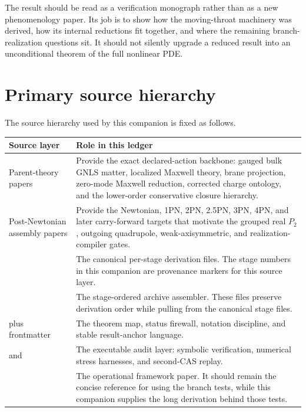 The result should be read as a verification monograph rather than as a new phenomenology paper.  Its job is to show how the moving-throat machinery was derived, how its internal reductions fit together, and where the remaining branch-realization questions sit.  It should not silently upgrade a reduced result into an unconditional theorem of the full nonlinear PDE.

\section{Primary source hierarchy}

The source hierarchy used by this companion is fixed as follows.

\begin{longtable}{L{0.25\textwidth}L{0.68\textwidth}}
\toprule
Source layer & Role in this ledger \\
\midrule
\endhead
Parent-theory papers & Provide the exact declared-action backbone: gauged bulk GNLS matter, localized Maxwell theory, brane projection, zero-mode Maxwell reduction, corrected charge ontology, and the lower-order conservative closure hierarchy. \\
\addlinespace
Post-Newtonian assembly papers & Provide the Newtonian, 1PN, 2PN, 2.5PN, 3PN, 4PN, and later carry-forward targets that motivate the grouped real \(P_2\), outgoing quadrupole, weak-axisymmetric, and realization-compiler gates. \\
\addlinespace
{} & The canonical per-stage derivation files.  The stage numbers in this companion are provenance markers for this source layer. \\
\addlinespace
{} & The stage-ordered archive assembler.  These files preserve derivation order while pulling from the canonical stage files. \\
\addlinespace
{} plus frontmatter & The theorem map, status firewall, notation discipline, and stable result-anchor language. \\
\addlinespace
{} and  & The executable audit layer: symbolic verification, numerical stress harnesses, and second-CAS replay. \\
\addlinespace
{} & The operational framework paper.  It should remain the concise reference for using the branch tests, while this companion supplies the long derivation behind those tests. \\
\bottomrule
\end{longtable}

